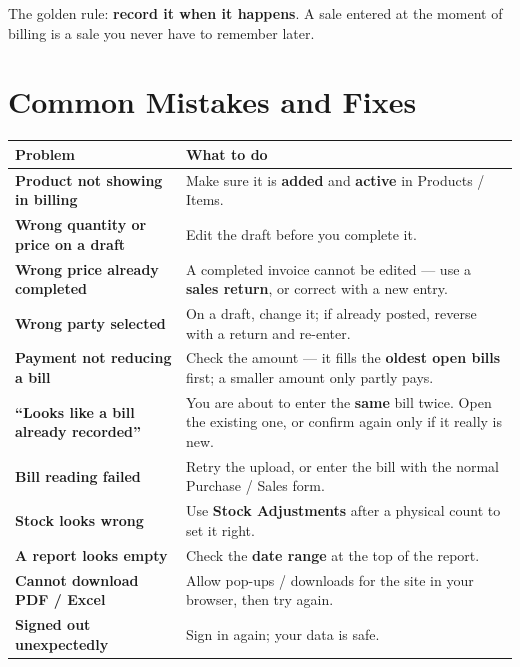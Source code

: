 \documentclass[11pt,a4paper,openany]{report}
\begin{document}
\begin{tipbox}
The golden rule: \textbf{record it when it happens}. A sale entered at the moment
of billing is a sale you never have to remember later.
\end{tipbox}

\chapter{Common Mistakes and Fixes}
\begin{center}
\small
\begin{tabularx}{\linewidth}{>{\bfseries\color{navy}}p{5.2cm} X}
\toprule
Problem & What to do \\
\midrule
Product not showing in billing & Make sure it is \textbf{added} and \textbf{active} in Products / Items. \\
Wrong quantity or price on a draft & Edit the draft before you complete it. \\
Wrong price already completed & A completed invoice cannot be edited — use a \textbf{sales return}, or correct with a new entry. \\
Wrong party selected & On a draft, change it; if already posted, reverse with a return and re-enter. \\
Payment not reducing a bill & Check the amount — it fills the \textbf{oldest open bills} first; a smaller amount only partly pays. \\
``Looks like a bill already recorded'' & You are about to enter the \textbf{same} bill twice. Open the existing one, or confirm again only if it really is new. \\
Bill reading failed & Retry the upload, or enter the bill with the normal Purchase / Sales form. \\
Stock looks wrong & Use \textbf{Stock Adjustments} after a physical count to set it right. \\
A report looks empty & Check the \textbf{date range} at the top of the report. \\
Cannot download PDF / Excel & Allow pop-ups / downloads for the site in your browser, then try again. \\
Signed out unexpectedly & Sign in again; your data is safe. \\
\bottomrule
\end{tabularx}
\end{center}
\end{document}
